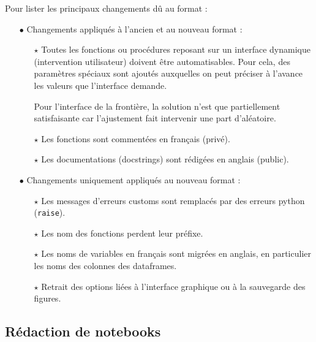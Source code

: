 \documentclass[12pt]{article}
\begin{document}
    Pour lister les principaux changements dû au format :
    \begin{enumerate}
        \item[$\bullet$] Changements appliqués à l'ancien et au nouveau format :

        \begin{enumerate}
            \item[$\star$] Toutes les fonctions ou procédures reposant sur un interface dynamique (intervention utilisateur) doivent être automatisables. Pour cela, des paramètres spéciaux sont ajoutés auxquelles on peut préciser à l'avance les valeurs que l'interface demande.

            Pour l'interface de la frontière, la solution n'est que partiellement satisfaisante car l'ajustement fait intervenir une part d'aléatoire.

            \item[$\star$] Les fonctions sont commentées en français (privé).

            \item[$\star$] Les documentations (docstrings) sont rédigées en anglais (public).
        \end{enumerate}
        
        \item[$\bullet$] Changements uniquement appliqués au nouveau format :

        \begin{enumerate}
            \item[$\star$] Les messages d'erreurs customs sont remplacés par des erreurs python (\texttt{raise}).

            \item[$\star$] Les nom des fonctions perdent leur préfixe.

            \item[$\star$] Les noms de variables en français sont migrées en anglais, en particulier les noms des colonnes des dataframes.

            \item[$\star$] Retrait des options liées à l'interface graphique ou à la sauvegarde des figures.
        \end{enumerate}
    \end{enumerate}

\newpage
\subsection{Rédaction de notebooks}
\end{document}
